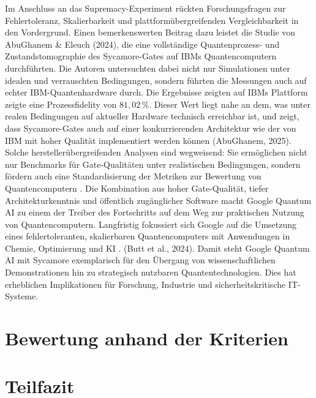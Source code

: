 Im Anschluss an das Supremacy-Experiment rückten Forschungsfragen zur Fehlertoleranz, Skalierbarkeit und plattformübergreifenden Vergleichbarkeit in den Vordergrund. Einen bemerkenswerten Beitrag dazu leistet die Studie von AbuGhanem & Eleuch (2024), die eine vollständige Quantenprozess- und Zustandstomographie des Sycamore-Gates auf IBMs Quantencomputern durchführten. Die Autoren untersuchten dabei nicht nur Simulationen unter idealen und verrauschten Bedingungen, sondern führten die Messungen auch auf echter IBM-Quantenhardware durch. Die Ergebnisse zeigten auf IBMs Plattform zeigte eine Prozessfidelity von \(81{,}02\,\%\). Dieser Wert liegt nahe an dem, was unter realen Bedingungen auf aktueller Hardware technisch erreichbar ist, und zeigt, dass Sycamore-Gates auch auf einer konkurrierenden Architektur wie der von IBM mit hoher Qualität implementiert werden können \cite{}(AbuGhanem, 2025).
Solche herstellerübergreifenden Analysen sind wegweisend: Sie ermöglichen nicht nur Benchmarks für Gate-Qualitäten unter realistischen Bedingungen, sondern fördern auch eine Standardisierung der Metriken zur Bewertung von Quantencomputern \cite{abughanemPhotonicQuantumComputers2024}. Die Kombination aus hoher Gate-Qualität, tiefer Architekturkenntnis und öffentlich zugänglicher Software macht Google Quantum AI zu einem der Treiber des Fortschritts auf dem Weg zur praktischen Nutzung von Quantencomputern. Langfristig fokussiert sich Google auf die Umsetzung eines fehlertoleranten, skalierbaren Quantencomputers mit Anwendungen in Chemie, Optimierung und KI \cite{}. (Butt et al., 2024).
Damit steht Google Quantum AI mit Sycamore exemplarisch für den Übergang von wissenschaftlichen Demonstrationen hin zu strategisch nutzbaren Quantentechnologien. Dies hat erheblichen Implikationen für Forschung, Industrie und sicherheitskritische IT-Systeme.


\section{Bewertung anhand der Kriterien}
\section{Teilfazit}


\printbibliography
